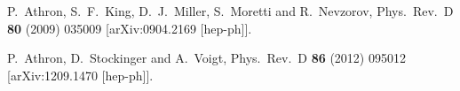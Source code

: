 \documentclass[final,3p,11pt,pdflatex]{elsarticle}
\begin{document}
\begin{thebibliography}{100}
  P.~Athron, S.~F.~King, D.~J.~Miller, S.~Moretti and R.~Nevzorov,
  Phys.\ Rev.\ D {\bf 80} (2009) 035009
  [arXiv:0904.2169 [hep-ph]].



  P.~Athron, D.~Stockinger and A.~Voigt,
  Phys.\ Rev.\ D {\bf 86} (2012) 095012
  [arXiv:1209.1470 [hep-ph]].

 

\end{thebibliography}
\end{document}
